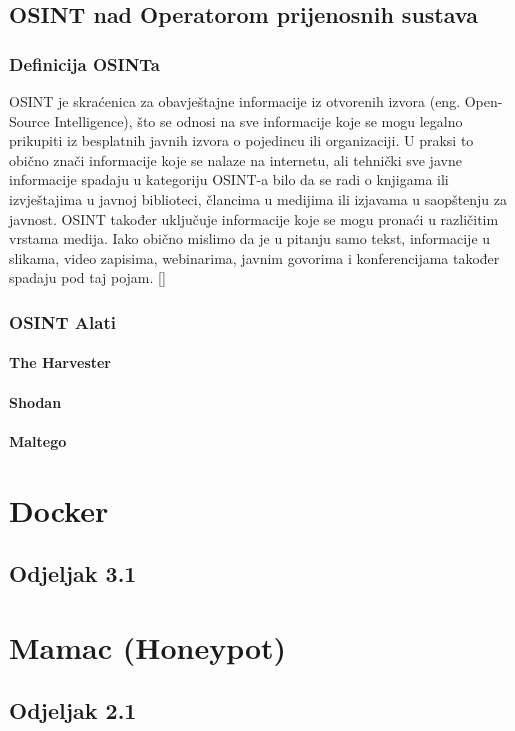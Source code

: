 \documentclass[times, utf8, zavrsni]{fer}
\begin{document}
\section{OSINT nad Operatorom prijenosnih sustava}
\subsection{Definicija OSINTa}
OSINT je skraćenica za obavještajne informacije iz otvorenih izvora (eng. Open-Source Intelligence), što se odnosi na sve informacije koje se mogu legalno prikupiti iz besplatnih javnih izvora o pojedincu ili organizaciji. U praksi to obično znači informacije koje se nalaze na internetu, ali tehnički sve javne informacije spadaju u kategoriju OSINT-a bilo da se radi o knjigama ili izvještajima u javnoj biblioteci, člancima u medijima ili izjavama u saopštenju za javnost.
OSINT također uključuje informacije koje se mogu pronaći u različitim vrstama medija. Iako obično mislimo da je u pitanju samo tekst, informacije u slikama, video zapisima, webinarima, javnim govorima i konferencijama također spadaju pod taj pojam. 
[\cite{osint-def}]
\subsection{OSINT Alati}
\subsubsection{The Harvester}
\subsubsection{Shodan}
\subsubsection{Maltego}

\chapter{Docker}
\section{Odjeljak 3.1}

\chapter{Mamac (Honeypot)}
\section{Odjeljak 2.1}
\end{document}

